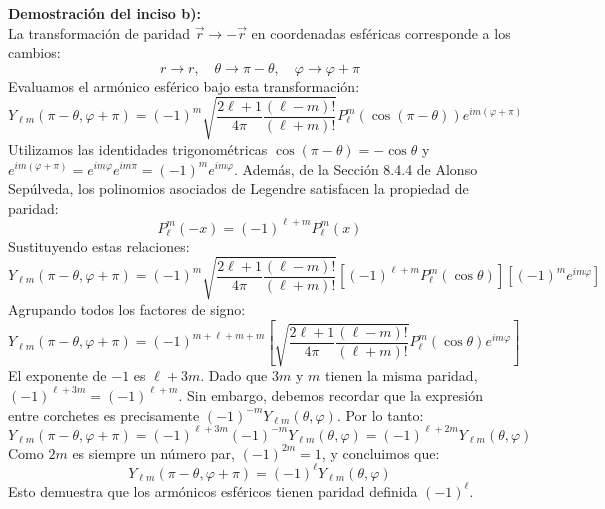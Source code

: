 \documentclass[a4paper]{article}
\begin{document}
\vspace{0.3cm}
\noindent\textbf{Demostración del inciso b):} \\
La transformación de paridad $\vec{r} \to -\vec{r}$ en coordenadas esféricas corresponde a los cambios:
$$
r \to r, \quad \theta \to \pi - \theta, \quad \varphi \to \varphi + \pi
$$
Evaluamos el armónico esférico bajo esta transformación:
$$
Y_{\ell m}(\pi - \theta, \varphi + \pi) = (-1)^m \sqrt{\frac{2\ell+1}{4\pi} \frac{(\ell-m)!}{(\ell+m)!}} P_\ell^m(\cos(\pi - \theta)) e^{im(\varphi + \pi)}
$$
Utilizamos las identidades trigonométricas $\cos(\pi - \theta) = -\cos\theta$ y $e^{im(\varphi + \pi)} = e^{im\varphi} e^{im\pi} = (-1)^m e^{im\varphi}$. Además, de la Sección 8.4.4 de Alonso Sepúlveda, los polinomios asociados de Legendre satisfacen la propiedad de paridad:
$$
P_\ell^m(-x) = (-1)^{\ell+m} P_\ell^m(x)
$$
Sustituyendo estas relaciones:
$$
Y_{\ell m}(\pi - \theta, \varphi + \pi) = (-1)^m \sqrt{\frac{2\ell+1}{4\pi} \frac{(\ell-m)!}{(\ell+m)!}} \left[ (-1)^{\ell+m} P_\ell^m(\cos\theta) \right] \left[ (-1)^m e^{im\varphi} \right]
$$
Agrupando todos los factores de signo:
$$
Y_{\ell m}(\pi - \theta, \varphi + \pi) = (-1)^{m + \ell + m + m} \left[ \sqrt{\frac{2\ell+1}{4\pi} \frac{(\ell-m)!}{(\ell+m)!}} P_\ell^m(\cos\theta) e^{im\varphi} \right]
$$
El exponente de $-1$ es $\ell + 3m$. Dado que $3m$ y $m$ tienen la misma paridad, $(-1)^{\ell+3m} = (-1)^{\ell+m}$. Sin embargo, debemos recordar que la expresión entre corchetes es precisamente $(-1)^{-m} Y_{\ell m}(\theta, \varphi)$. Por lo tanto:
$$
Y_{\ell m}(\pi - \theta, \varphi + \pi) = (-1)^{\ell+3m} (-1)^{-m} Y_{\ell m}(\theta, \varphi) = (-1)^{\ell+2m} Y_{\ell m}(\theta, \varphi)
$$
Como $2m$ es siempre un número par, $(-1)^{2m} = 1$, y concluimos que:
$$
Y_{\ell m}(\pi - \theta, \varphi + \pi) = (-1)^\ell Y_{\ell m}(\theta, \varphi)
$$
Esto demuestra que los armónicos esféricos tienen paridad definida $(-1)^\ell$.
\end{document}
